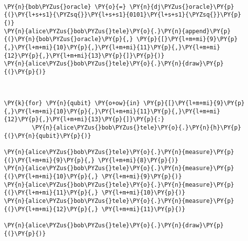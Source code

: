             
    
    \begin{center}
    \end{center}
    { \hspace*{\fill} \\}
    

    \begin{tcolorbox}[breakable, size=fbox, boxrule=1pt, pad at break*=1mm,colback=cellbackground, colframe=cellborder]
\begin{Verbatim}[commandchars=\\\{\}]
\PY{n}{bob\PYZus{}oracle} \PY{o}{=} \PY{n}{dj\PYZus{}oracle}\PY{p}{(}\PY{l+s+s1}{\PYZsq{}}\PY{l+s+s1}{0101}\PY{l+s+s1}{\PYZsq{}}\PY{p}{)}
\PY{n}{alice\PYZus{}bob\PYZus{}tele}\PY{o}{.}\PY{n}{append}\PY{p}{(}\PY{n}{bob\PYZus{}oracle}\PY{p}{,} \PY{p}{[}\PY{l+m+mi}{9}\PY{p}{,}\PY{l+m+mi}{10}\PY{p}{,}\PY{l+m+mi}{11}\PY{p}{,}\PY{l+m+mi}{12}\PY{p}{,}\PY{l+m+mi}{13}\PY{p}{]}\PY{p}{)}
\PY{n}{alice\PYZus{}bob\PYZus{}tele}\PY{o}{.}\PY{n}{draw}\PY{p}{(}\PY{p}{)}
\end{Verbatim}
\end{tcolorbox}
 
            
    
    \begin{center}
    \end{center}
    { \hspace*{\fill} \\}
    

    \begin{tcolorbox}[breakable, size=fbox, boxrule=1pt, pad at break*=1mm,colback=cellbackground, colframe=cellborder]
\begin{Verbatim}[commandchars=\\\{\}]
\PY{k}{for} \PY{n}{qubit} \PY{o+ow}{in} \PY{p}{[}\PY{l+m+mi}{9}\PY{p}{,}\PY{l+m+mi}{10}\PY{p}{,}\PY{l+m+mi}{11}\PY{p}{,}\PY{l+m+mi}{12}\PY{p}{,}\PY{l+m+mi}{13}\PY{p}{]}\PY{p}{:}
        \PY{n}{alice\PYZus{}bob\PYZus{}tele}\PY{o}{.}\PY{n}{h}\PY{p}{(}\PY{n}{qubit}\PY{p}{)}
    
\PY{n}{alice\PYZus{}bob\PYZus{}tele}\PY{o}{.}\PY{n}{measure}\PY{p}{(}\PY{l+m+mi}{9}\PY{p}{,} \PY{l+m+mi}{8}\PY{p}{)}
\PY{n}{alice\PYZus{}bob\PYZus{}tele}\PY{o}{.}\PY{n}{measure}\PY{p}{(}\PY{l+m+mi}{10}\PY{p}{,} \PY{l+m+mi}{9}\PY{p}{)}
\PY{n}{alice\PYZus{}bob\PYZus{}tele}\PY{o}{.}\PY{n}{measure}\PY{p}{(}\PY{l+m+mi}{11}\PY{p}{,} \PY{l+m+mi}{10}\PY{p}{)}
\PY{n}{alice\PYZus{}bob\PYZus{}tele}\PY{o}{.}\PY{n}{measure}\PY{p}{(}\PY{l+m+mi}{12}\PY{p}{,} \PY{l+m+mi}{11}\PY{p}{)}

\PY{n}{alice\PYZus{}bob\PYZus{}tele}\PY{o}{.}\PY{n}{draw}\PY{p}{(}\PY{p}{)}
\end{Verbatim}
\end{tcolorbox}
 
